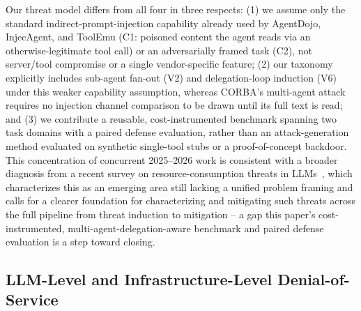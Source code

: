 \documentclass[conference]{IEEEtran}
\begin{document}
Our threat model differs from all four in three respects: (1) we assume only the standard indirect-prompt-injection capability already used by AgentDojo, InjecAgent, and ToolEmu (C1: poisoned content the agent reads via an otherwise-legitimate tool call) or an adversarially framed task (C2), not server/tool compromise or a single vendor-specific feature; (2) our taxonomy explicitly includes sub-agent fan-out (V2) and delegation-loop induction (V6) under this weaker capability assumption, whereas CORBA's multi-agent attack requires no injection channel comparison to be drawn until its full text is read; and (3) we contribute a reusable, cost-instrumented benchmark spanning two task domains with a paired defense evaluation, rather than an attack-generation method evaluated on synthetic single-tool stubs or a proof-of-concept backdoor. This concentration of concurrent 2025--2026 work is consistent with a broader diagnosis from a recent survey on resource-consumption threats in LLMs~\cite{zhang2026resourcesurvey}, which characterizes this as an emerging area still lacking a unified problem framing and calls for a clearer foundation for characterizing and mitigating such threats across the full pipeline from threat induction to mitigation -- a gap this paper's cost-instrumented, multi-agent-delegation-aware benchmark and paired defense evaluation is a step toward closing.

\subsection{LLM-Level and Infrastructure-Level Denial-of-Service}
\end{document}
